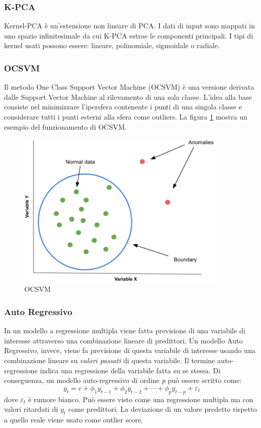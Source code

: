 \subsubsection{K-PCA}
Kernel-PCA \cite{hoffmann2007kernel} è un'estensione non lineare di PCA. I dati di input sono mappati in uno spazio infinitesimale da cui K-PCA estrae le componenti principali. I tipi di kernel usati possono essere: lineare, polinomiale, sigmoidale o radiale.

\subsubsection{OCSVM}
Il metodo One Class Support Vector Machine (OCSVM) \cite{scholkopf2001estimating} è una versione derivata dalle Support Vector Machine al rilevamento di una sola classe. L'idea alla base consiste nel minimizzare l'ipersfera contenente i punti di una singola classe e considerare tutti i punti esterni alla sfera come outliers.
La figura \ref{ocsvm} mostra un esempio del funzionamento di OCSVM.
\begin{figure}[t]
	\centering
	\includegraphics[width=10cm, scale=1]{images/ocsvm}
	\caption{OCSVM}
	\label{ocsvm}
\end{figure}


\subsubsection{Auto Regressivo}
In un modello a regressione multipla viene fatta previsione di una variabile di interesse attraverso una combinazione lineare di predittori. Un modello Auto Regressivo, invece, viene fa previsione di questa variabile di interesse usando una combinazione lineare su \textit{valori passati} di questa variabile. Il termine auto-regressione indica una regressione della variabile fatta su se stessa.
Di conseguenza, un modello auto-regressivo di ordine \textit{p} può essere scritto come:
\[y_t=c+\phi_1 y_{t-1}+\phi_2 y_{t-2}+\cdots+\phi_p y_{t-p}+\varepsilon_t\]
dove $\varepsilon_t$ è rumore bianco. Può essere visto come una regressione multipla ma con valori ritardati di $y_t$ come predittori. 
La deviazione di un valore predetto rispetto a quello reale viene usato come outlier score.

